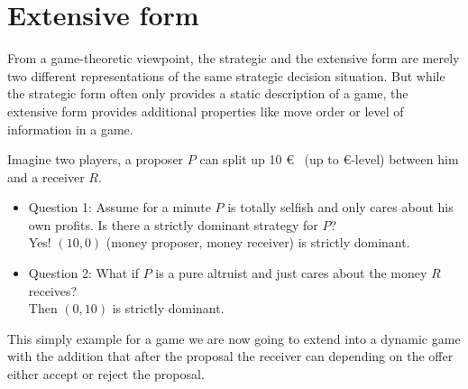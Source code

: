 

\section{Extensive form}

From a game-theoretic viewpoint, the strategic and the extensive form are merely two different representations of the same strategic decision situation. But while the strategic form often only provides a static description of a game, the extensive form provides additional properties like move order or level of information in a game.

\begin{example} \label{Dictator-Game} 
Imagine two players, a proposer $P$ can split up 10 \euro ~ (up to \euro-level) between him and a receiver $R$. 
	\begin{itemize}
		\item Question 1: Assume for a minute $P$ is totally selfish and only cares about his own profits. Is there a strictly dominant strategy for $P$? \\
			Yes! $(10, 0)$ (money proposer, money receiver) is strictly dominant.
		\item Question 2: What if $P$ is a pure altruist and just cares about the money $R$ receives? \\
			Then $(0, 10)$ is strictly dominant.
	\end{itemize}
\end{example}

This simply example for a game we are now going to extend into a dynamic game with the addition that after the proposal the receiver can depending on the offer either accept or reject the proposal.

